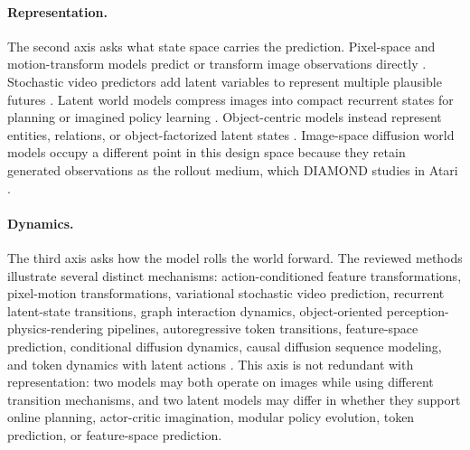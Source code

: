 \paragraph{Representation.}
The second axis asks what state space carries the prediction. Pixel-space and motion-transform models predict or transform image observations directly \cite{oh2015_action_conditional_video_prediction_prov,finn2016_physical_interaction_video_prediction_prov}. Stochastic video predictors add latent variables to represent multiple plausible futures \cite{babaeizadeh2018_sv2p_prov}. Latent world models compress images into compact recurrent states for planning or imagined policy learning \cite{ha2018_world_models_prov,hafner2019_planet_prov,hafner2020_dreamer_prov}. Object-centric models instead represent entities, relations, or object-factorized latent states \cite{battaglia2016_interaction_networks_prov,watters2017_visual_interaction_networks_prov,janner2019_o2p2_prov}. Image-space diffusion world models occupy a different point in this design space because they retain generated observations as the rollout medium, which DIAMOND studies in Atari \cite{alonso2024_diamond_prov}.

\paragraph{Dynamics.}
The third axis asks how the model rolls the world forward. The reviewed methods illustrate several distinct mechanisms: action-conditioned feature transformations, pixel-motion transformations, variational stochastic video prediction, recurrent latent-state transitions, graph interaction dynamics, object-oriented perception-physics-rendering pipelines, autoregressive token transitions, feature-space prediction, conditional diffusion dynamics, causal diffusion sequence modeling, and token dynamics with latent actions \cite{oh2015_action_conditional_video_prediction_prov,finn2016_physical_interaction_video_prediction_prov,babaeizadeh2018_sv2p_prov,hafner2019_planet_prov,hafner2020_dreamer_prov,battaglia2016_interaction_networks_prov,janner2019_o2p2_prov,wu2024ivideogpt,assran2025vjepa2_prov,alonso2024_diamond_prov,chen2024diffusion_forcing_prov,bruce2024_genie_prov}. This axis is not redundant with representation: two models may both operate on images while using different transition mechanisms, and two latent models may differ in whether they support online planning, actor-critic imagination, modular policy evolution, token prediction, or feature-space prediction.

